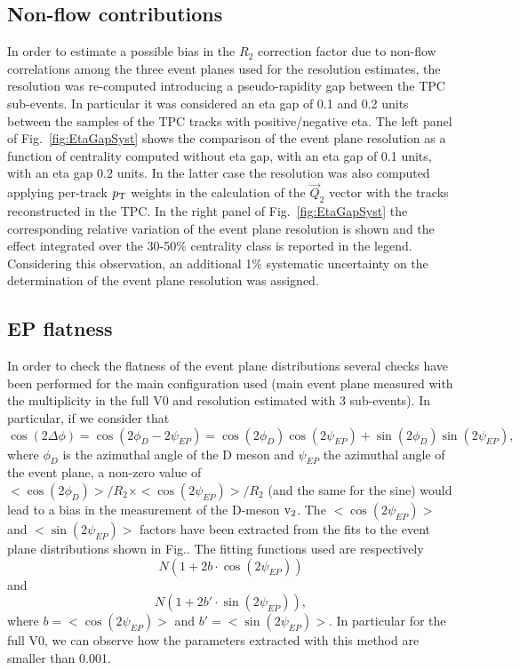 \subsection{Non-flow contributions}
\label{sec:NonFlow}
In order to estimate a possible bias in the $R_2$ correction factor due to non-flow correlations among the three 
event planes used for the resolution estimates,
the resolution was re-computed introducing 
a pseudo-rapidity gap between the TPC sub-events. 
In particular it was considered an eta 
gap of 0.1 and 0.2 units between the samples of the TPC tracks with positive/negative 
eta. The left panel of Fig.~\ref{fig:EtaGapSyst} shows
 the comparison of the event plane resolution
as a function of centrality computed without eta gap, 
with an eta gap of 0.1 units, with an eta gap 0.2 units. 
In the latter case the resolution was also computed 
applying per-track $p_{\rm T}$ weights in the calculation of the $\vec{Q}_2$ vector with
the tracks reconstructed in the TPC.
In the right panel of Fig.~\ref{fig:EtaGapSyst} the corresponding 
relative variation of the event plane resolution is shown and the effect integrated over the 
30-50\% centrality class is reported in the legend. Considering this observation, an additional 1\%
 systematic uncertainty on the determination of the
event plane resolution was assigned.
\iffalse
\subsection{EP flatness}
\label{sec:EPflat}
In order to check the flatness of the event plane 
distributions several checks have been performed 
for the main configuration used (main event plane 
measured with the multiplicity in the full V0 and
 resolution estimated with 3 sub-events). In particular, if we consider that
\begin{equation}
\cos(2\Delta\phi) = \cos(2\phi_D-2\psi_{EP}) = \cos(2\phi_D)\cos(2\psi_{EP})+\sin(2\phi_D)\sin(2\psi_{EP}),
\end{equation}
where $\phi_D$ is the azimuthal angle of the D meson 
and $\psi_{EP}$ the azimuthal angle of the event plane, 
a non-zero value of 
$< \cos(2\phi_D) >/R_2 \times < \cos(2\psi_{EP}) >/R_2$ 
(and the same for the sine) would lead to a bias in the 
measurement of the D-meson $\rm v_2$. The  
$< \cos(2\psi_{EP}) >$ and $< \sin(2\psi_{EP}) >$ factors 
have been extracted from the fits to the event plane 
distributions shown in Fig.. The fitting functions used are respectively 
\begin{equation}
N(1+2b\cdot \cos(2\psi_{EP}))
\end{equation}
and 
\begin{equation}
N(1+2b'\cdot \sin(2\psi_{EP})),
\end{equation}
where $b = < \cos(2\psi_{EP}) >$ and $b' = < \sin(2\psi_{EP}) >$.
In particular for the full V0, we can observe how the parameters 
extracted with this method are smaller than 0.001.


